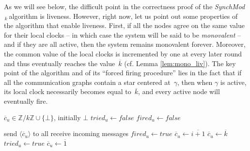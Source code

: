 \documentclass{article}
\newcommand{\cent}{\gamma}
\newcommand{\SM}{{\em SynchMod}$_{\,k}\ $}
\begin{document}
As we will see below, the difficult point in the correctness proof of the \SM algorithm is liveness.
However, right now, let us point out some properties of the algorithm that enable liveness.
First, if all the nodes  agree on the same value for their local clocks 
	-- in which case the system will be said to be \emph{monovalent} -- and if they are all active, 
	then the system remains monovalent forever.
Moreover, the common value of the local clocks is incremented by one at every later round and thus eventually 
	reaches the value~$\overline{k} $ (cf. Lemma \ref{lem:mono_liv}).
The key point of the algorithm and of its ``forced firing procedure'' lies in the fact that if all the communication graphs  
	contain a star centered at~$\cent$, then when  $\cent$ is active, its local clock necessarily becomes equal 
	to~$\overline{k}$, and every active node will eventually fire. 


\begin{algorithm}[htb]\label{algo:code}
\begin{distribalgo}[1]
\BLANK {}
	\STATE $\overline{c}_u \in \mathds{Z}/k\mathds{Z} \cup \{\bot\}$, initially $\bot$
	\STATE $tried_u \leftarrow false$
	\STATE $fired_u \leftarrow false$

\ENDINDENT \BLANK

	\STATE send $\langle \overline{c}_u \rangle$ to all 
	\STATE receive incoming messages
		\STATE $fired_u \leftarrow true$ \label{line:fire}
	\ENDIF
		\STATE $\overline{c}_u \leftarrow \overline{i+1} $ \label{line:agreed}
	\ELSE {}
		\STATE $\overline{c}_u \leftarrow \overline{k} $  \label{line:try}
		\STATE $tried_u \leftarrow true$   \label{line:try+1}
	\ELSE
		\STATE $\overline{c}_u \leftarrow \overline{1}$ \label{line:tried}
	\ENDIF
	\ENDIF
\ENDINDENT 

\caption{The \SM algorithm} \label{algo:R}
\end{distribalgo}

\end{algorithm}
\end{document}
